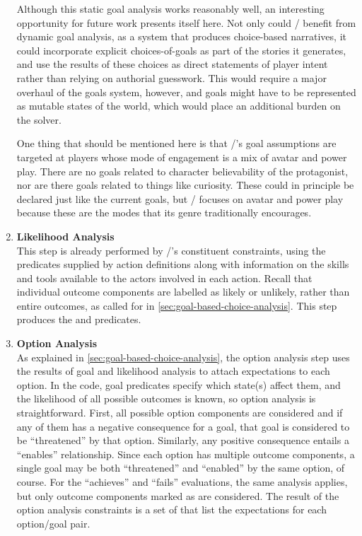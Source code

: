 \begin{enumerate}
Although this static goal analysis works reasonably well, an interesting opportunity for future work presents itself here.
%
Not only could \dunyazad/ benefit from dynamic goal analysis, as a system that produces choice-based narratives, it could incorporate explicit choices-of-goals as part of the stories it generates, and use the results of these choices as direct statements of player intent rather than relying on authorial guesswork.
%
This would require a major overhaul of the goals system, however, and goals might have to be represented as mutable states of the world, which would place an additional burden on the solver.

\label{sec:dunyazad-modes-of-engagement}%
One thing that should be mentioned here is that \dunyazad/'s goal assumptions are targeted at players whose mode of engagement is a mix of avatar and power play.
%
There are no goals related to character believability of the protagonist, nor are there goals related to things like curiosity.
%
These could in principle be declared just like the current goals, but \dunyazad/ focuses on avatar and power play because these are the modes that its genre traditionally encourages.

\item %
\textbf{Likelihood Analysis} \\
%
This step is already performed by \dunyazad/'s constituent constraints, using the  predicates supplied by action definitions along with information on the skills and tools available to the actors involved in each action. 
%
Recall that individual outcome components are labelled as likely or unlikely, rather than entire outcomes, as called for in \cref{sec:goal-based-choice-analysis}.
%
This step produces the  and  predicates.

\item %
\textbf{Option Analysis} \\
\label{page:option-analysis}%
%
As explained in \cref{sec:goal-based-choice-analysis}, the option analysis step uses the results of goal and likelihood analysis to attach expectations to each option.
%
In the code, goal predicates specify which state(s) affect them, and the likelihood of all possible outcomes is known, so option analysis is straightforward.
%
First, all possible option components are considered and if any of them has a negative consequence for a goal, that goal is considered to be ``threatened'' by that option.
%
Similarly, any positive consequence entails a ``enables'' relationship.
%
Since each option has multiple outcome components, a single goal may be both ``threatened'' and ``enabled'' by the same option, of course.
%
For the ``achieves'' and ``fails'' evaluations, the same analysis applies, but only outcome components marked as  are considered.
%
The result of the option analysis constraints is a set of  that list the expectations for each option/goal pair.


\end{enumerate}
